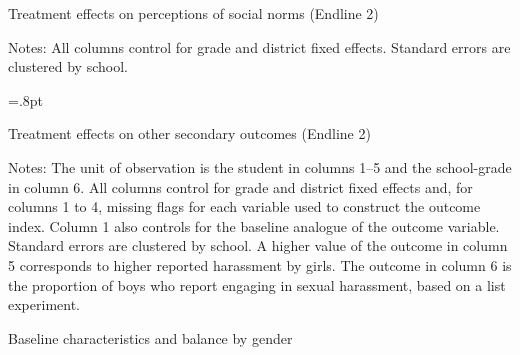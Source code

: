 \documentclass[letterpaper,12pt,pdftex]{article}
\begin{document}
\begin{landscape}
\begin{table}
\tabcolsep=2.5pt
		\caption{Treatment effects on perceptions of social norms (Endline 2)}
		\label{tab_social_norms_el2}
		\begin{center}
			\small
		
		\end{center}
\flushleft \footnotesize {Notes: All columns control for grade and district fixed effects. Standard errors are clustered by school.}
\end{table}
\end{landscape}

\newpage
\clearpage

\begin{table}	
	\tabcolsep=.8pt
	\caption{Treatment effects on other secondary outcomes (Endline 2)}
	\label{tab_el2_sec}
		\vspace{.4cm}
	\begin{center}
		\small
		
	\end{center}
	\flushleft \footnotesize {Notes: The unit of observation is the student in columns 1--5 and the school-grade in column 6. All columns control for grade and district fixed effects and, for columns 1 to 4, missing flags for each variable used to construct the outcome index. Column 1 also controls for the baseline analogue of the outcome variable. Standard errors are clustered by school. A higher value of the outcome in column 5 corresponds to higher reported harassment by girls. The outcome in column 6 is the proportion of boys who report engaging in sexual harassment, based on a list experiment. }
\end{table}
\clearpage


\setcounter{table}{0}
\renewcommand{\tablename}{Appendix Table}
\setcounter{figure}{0}
\renewcommand{\figurename}{Appendix Figure}


\newpage \normalsize
{ }


\clearpage
\newpage

\begin{landscape}
\begin{table}
\caption{Baseline characteristics and balance by gender}
\label{desc_stats_bygender}
\begin{center}
\scriptsize

\end{center}
\end{table}
\end{landscape}
\end{document}
